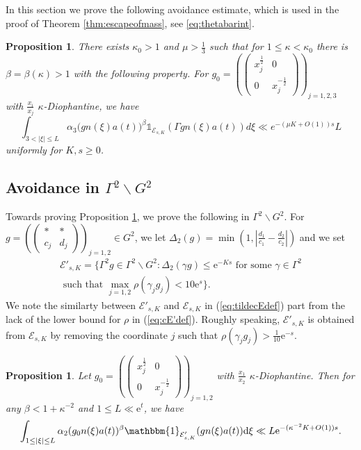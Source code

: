 \documentclass[12pt]{amsart}
\newtheorem{prop}[thm]{Proposition}
\theoremstyle{definition}
\theoremstyle{remark}
\numberwithin{equation}{section}
\newcommand{\dd}{\mathrm{d}}
\newcommand{\e}{\mathrm{e}}
\newcommand{\cE}{\mathcal{E}}
\begin{document}
In this section we prove the following avoidance estimate, which is used in the proof of Theorem \ref{thm:escapeofmass}, see \eqref{eq:thetabarint}.
\begin{prop}\label{prop:avoidanceMargulis}
  There exists $\kappa_0 > 1$ and $\mu > \tfrac{1}{3}$ such that for $1 \leq \kappa < \kappa_0$ there is $\beta = \beta(\kappa) > 1$ with the following property.
  For $g_0 = \left(\begin{pmatrix}    x_j^{\frac{1}{2}} & 0 \\
    0 & x_j^{-\frac{1}{2}}
  \end{pmatrix}
  \right)_{\!\! j=1,2,3}$ with $\tfrac{x_i}{x_j}$ $\kappa$-Diophantine, we have
  \begin{equation}
    \label{eq:avoidanceMargulis}
    \int_{3 < |\xi| \leq  L} \alpha_3\big(gn(\xi)a(t)\big)^{\beta}\mathds{1}_{\cE_{s,K}}(\Gamma gn(\xi)a(t))d\xi\ll e^{-(\mu K+O(1))s}L
  \end{equation}
  uniformly for $K, s \geq 0$. 
\end{prop}

\subsection{Avoidance in $\Gamma^2 \backslash G^2$}
\label{sec:rank2avoidance}

Towards proving Proposition \ref{prop:avoidanceMargulis}, we prove the following in $\Gamma^2 \backslash G^2$.
For $g =\left(
\begin{pmatrix}
  * & * \\
  c_j & d_j 
\end{pmatrix}
\right)_{\!\! j=1,2}
\in G^2$, we let $\Delta_2(g) = \min(1, |\tfrac{d_1}{c_1} - \tfrac{d_2}{c_2}|)$ and we set
\begin{multline}
  \label{eq:cE'def}
  \cE'_{s,K} = \{ \Gamma^2 g \in \Gamma^2 \backslash G^2: \Delta_2(\gamma g) \leq \e^{-Ks}\textrm{ for some } \gamma \in \Gamma^2\\
  \textrm{ such that } \max_{j=1,2} \rho(\gamma_j g_j) < 10 \e^s \}. 
\end{multline}
We note the similarty between $\cE'_{s,K}$ and $\cE_{s,K}$ in (\ref{eq:tildecEdef}) part from the lack of the lower bound for $\rho$ in (\ref{eq:cE'def}).
Roughly speaking, $\cE'_{s,K}$ is obtained from $\cE_{s,K}$ by removing the coordinate $j$ such that $\rho(\gamma_j g_j) > \tfrac{1}{10} \e^{-s}$. 
\begin{prop}
  \label{prop:rank2avoidance}
  Let $g_0 = \left(\begin{pmatrix}    x_j^{\frac{1}{2}} & 0 \\
    0 & x_j^{-\frac{1}{2}}
  \end{pmatrix}
  \right)_{\!\! j=1,2}$ with $\tfrac{x_1}{x_2}$ $\kappa$-Diophantine.
  Then for any $\beta < 1 + \kappa^{-2}$ and $1\leq L \ll \e^t$, we have
  \begin{equation}
    \label{eq:rank2moment1}
    \int_{1 \leq |\xi| \leq L} \alpha_2(g_0 n(\xi) a(t))^\beta \mathbbm{1}_{\cE'_{s,K}}(gn(\xi)a(t)) \dd \xi \ll L \e^{-(\kappa^{-2} K + O(1))s} .
  \end{equation}
\end{prop}
\end{document}
